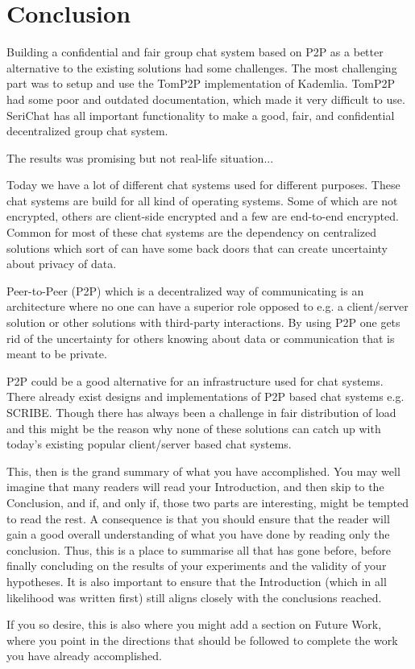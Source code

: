 \chapter{Conclusion}
\label{cha:conclusion}
Building a confidential and fair group chat system based on P2P as a better alternative to the existing solutions had some challenges. 
The most challenging part was to setup and use the TomP2P implementation of Kademlia. TomP2P had some poor and outdated documentation, which made it very difficult to use.  
SeriChat has all important functionality to make a good, fair, and confidential decentralized group chat system.   

The results was promising but not real-life situation...




Today we have a lot of different chat systems used for different purposes. These chat systems are build for all kind of operating systems. 
Some of which are not encrypted, others are client-side encrypted and a few are end-to-end encrypted. Common for most of these chat systems are the dependency on centralized solutions which sort of can have some back doors that can create uncertainty about privacy of data. 

Peer-to-Peer (P2P) which is a decentralized way of communicating is an architecture where no one can have a superior role opposed to e.g. a client/server solution or other solutions with third-party interactions. By using P2P one gets rid of the uncertainty for others knowing about data or communication that is meant to be private. 

P2P could be a good alternative for an infrastructure used for chat systems. There already exist designs and implementations of P2P based chat systems e.g. SCRIBE. Though there has always been a challenge in fair distribution of load and this might be the reason why none of these solutions can catch up with today's existing popular client/server based chat systems.  










This, then is the grand summary of what you have accomplished.  You
may well imagine that many readers will read your Introduction, and
then skip to the Conclusion, and if, and only if, those two parts are
interesting, might be tempted to read the rest. A consequence is that
you should ensure that the reader will gain a good overall
understanding of what you have done by reading only the conclusion.
Thus, this is a place to summarise all that has gone before, before
finally concluding on the results of your experiments and the validity
of your hypotheses. It is also important to ensure that the
Introduction (which in all likelihood was written first) still aligns
closely with the conclusions reached.

If you so desire, this is also where you might add a section on Future
Work, where you point in the directions that should be followed to
complete the work you have already accomplished.

